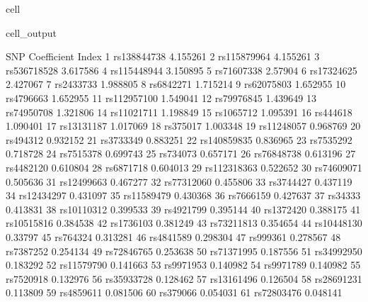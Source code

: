\documentclass[letterpaper,10pt,english]{jupyterBook}
\begin{document}
\begin{sphinxuseclass}{cell}
\begin{sphinxVerbatimOutput}
\begin{sphinxuseclass}{cell_output}
\begin{sphinxVerbatim}[commandchars=\\\{\}]
                SNP Coefficient
Index                          
1       rs138844738   \PYGZhy{}4.155261
2       rs115879964   \PYGZhy{}4.155261
3       rs536718528   \PYGZhy{}3.617586
4       rs115448944   \PYGZhy{}3.150895
5        rs71607338    \PYGZhy{}2.57904
6        rs17324625   \PYGZhy{}2.427067
7         rs2433733   \PYGZhy{}1.988805
8         rs6842271   \PYGZhy{}1.715214
9        rs62075803   \PYGZhy{}1.652955
10        rs4796663   \PYGZhy{}1.652955
11      rs112957100   \PYGZhy{}1.549041
12       rs79976845   \PYGZhy{}1.439649
13       rs74950708   \PYGZhy{}1.321806
14       rs11021711   \PYGZhy{}1.198849
15        rs1065712   \PYGZhy{}1.095391
16         rs444618   \PYGZhy{}1.090401
17       rs13131187   \PYGZhy{}1.017069
18         rs375017   \PYGZhy{}1.003348
19       rs11248057   \PYGZhy{}0.968769
20         rs494312   \PYGZhy{}0.932152
21        rs3733349   \PYGZhy{}0.883251
22      rs140859835   \PYGZhy{}0.836965
23        rs7535292   \PYGZhy{}0.718728
24        rs7515378   \PYGZhy{}0.699743
25         rs734073   \PYGZhy{}0.657171
26       rs76848738   \PYGZhy{}0.613196
27        rs4482120   \PYGZhy{}0.610804
28        rs6871718   \PYGZhy{}0.604013
29      rs112318363   \PYGZhy{}0.522652
30       rs74609071   \PYGZhy{}0.505636
31       rs12499663   \PYGZhy{}0.467277
32       rs77312060   \PYGZhy{}0.455806
33        rs3744427   \PYGZhy{}0.437119
34       rs12434297   \PYGZhy{}0.431097
35       rs11589479   \PYGZhy{}0.430368
36        rs7666159   \PYGZhy{}0.427637
37          rs34333   \PYGZhy{}0.413831
38       rs10110312   \PYGZhy{}0.399533
39        rs4921799   \PYGZhy{}0.395144
40        rs1372420   \PYGZhy{}0.388175
41       rs10515816   \PYGZhy{}0.384538
42        rs1736103   \PYGZhy{}0.381249
43       rs73211813   \PYGZhy{}0.354654
44       rs10448130    \PYGZhy{}0.33797
45         rs764324   \PYGZhy{}0.313281
46        rs4841589   \PYGZhy{}0.298304
47         rs999361   \PYGZhy{}0.278567
48        rs7387252   \PYGZhy{}0.254134
49       rs72846765   \PYGZhy{}0.253638
50       rs71371995   \PYGZhy{}0.187556
51       rs34992950   \PYGZhy{}0.183292
52       rs11579790   \PYGZhy{}0.141663
53        rs9971953   \PYGZhy{}0.140982
54        rs9971789   \PYGZhy{}0.140982
55        rs7520918   \PYGZhy{}0.132976
56       rs35933728   \PYGZhy{}0.128462
57       rs13161496   \PYGZhy{}0.126504
58       rs28691231   \PYGZhy{}0.113809
59        rs4859611   \PYGZhy{}0.081506
60         rs379066   \PYGZhy{}0.054031
61       rs72803476   \PYGZhy{}0.048141

\end{sphinxVerbatim}
\end{sphinxuseclass}
\end{sphinxVerbatimOutput}
\end{sphinxuseclass}
\end{document}
